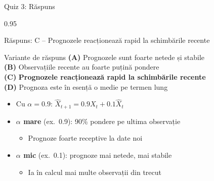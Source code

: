 \documentclass[9pt, aspectratio=169, t]{beamer}
\begin{document}
\begin{frame}{Quiz 3: Răspuns}
    \begin{cminipage}{0.95\textwidth}
    \begin{exampleblock}{Răspuns: C -- Prognozele reacționează rapid la schimbările recente}
    {\small
        \begin{block}{Variante de răspuns}
            \textcolor{MainBlue}{\textbf{(A)}} Prognozele sunt foarte netede și stabile \incorrect\\[3pt]
            \textcolor{MainBlue}{\textbf{(B)}} Observațiile recente au foarte puțină pondere \incorrect\\[3pt]
            \textcolor{MainBlue}{\textbf{(C)}} \textbf{\textcolor{Forest}{Prognozele reacționează rapid la schimbările recente}} \correct\\[3pt]
            \textcolor{MainBlue}{\textbf{(D)}} Prognoza este în esență o medie pe termen lung \incorrect
        \end{block}

        \vspace{0.1cm}

        \begin{itemize}\setlength{\itemsep}{0pt}
            \item Cu $\alpha = 0.9$: $\hat{X}_{t+1} = 0.9 X_t + 0.1 \hat{X}_t$
            \item \textbf{$\alpha$ mare} (ex.\ 0.9): 90\% pondere pe ultima observație
                \begin{itemize}\setlength{\itemsep}{0pt}
                    \item Prognoze foarte receptive la date noi
                \end{itemize}
            \item \textbf{$\alpha$ mic} (ex.\ 0.1): prognoze mai netede, mai stabile
                \begin{itemize}\setlength{\itemsep}{0pt}
                    \item Ia în calcul mai multe observații din trecut
                \end{itemize}
        \end{itemize}
    }
    \end{exampleblock}
    
    \end{cminipage}
\end{frame}
\end{document}
